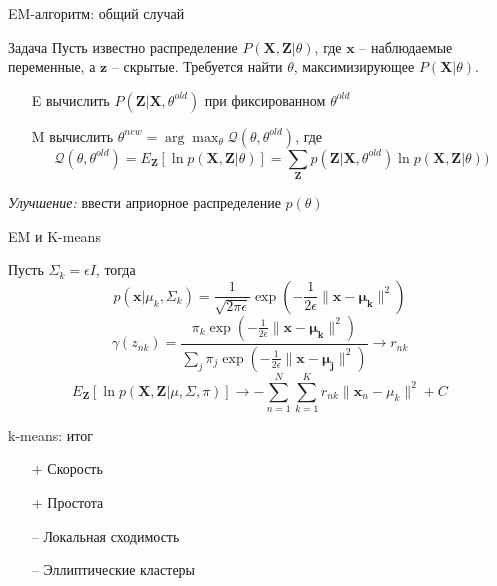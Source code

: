 \documentclass[10pt,a4paper]{beamer}
\begin{document}
\begin{frame}{EM-алгоритм: общий случай}

\begin{block}{Задача}
Пусть известно распределение $P(\mathbf{X}, \mathbf{Z} | \theta)$, где $\mathbf{x}$ -- наблюдаемые переменные, а $\mathbf{z}$ -- скрытые. Требуется найти $\theta$,  максимизирующее $P(\mathbf{X} | \theta)$.
\end{block}

\vspace{1em}
\begin{itemize}
\item[E] вычислить $P(\mathbf{Z} | \mathbf{X}, \theta^{old})$ при фиксированном $\theta^{old}$
\item[M] вычислить $\theta^{new} = \arg \max_{\theta} \mathcal{Q} (\theta, \theta^{old})$, где
\[
\mathcal{Q} (\theta, \theta^{old}) = E_\mathbf{Z}[\ln p(\mathbf{X}, \mathbf{Z} | \theta)] = \sum_{\mathbf{Z}} p(\mathbf{Z} | \mathbf{X}, \theta^{old}) \ln p(\mathbf{X}, \mathbf{Z} | \theta))
\]
\end{itemize}
{\it Улучшение:} ввести априорное распределение $p(\theta)$

\end{frame}


\begin{frame}{EM и K-means}

Пусть $\Sigma_k = \epsilon I$, тогда
\[
p(\mathbf{x} | \mu_k, \Sigma_k) = \frac{1}{\sqrt{2\pi\epsilon}}\exp(-\frac{1}{2\epsilon}\|\mathbf{x}-\mathbf{\mu_k}\|^2)
\]
\[
\gamma(z_{nk}) = \frac{\pi_k \exp(-\frac{1}{2\epsilon}\|\mathbf{x}-\mathbf{\mu_k}\|^2)}{\sum_j \pi_j \exp(-\frac{1}{2\epsilon}\|\mathbf{x}-\mathbf{\mu_j}\|^2)} \rightarrow r_{nk}
\]
\[
E_\mathbf{Z}[\ln p(\mathbf{X}, \mathbf{Z} | \mu, \Sigma, \pi)] \rightarrow -\sum_{n=1}^N \sum_{k=1}^K r_{nk} \| \mathbf{x}_n - \mu_k \|^2 + C
\]

\end{frame}


\begin{frame}{k-means: итог}

\begin{itemize}
\item[+] Скорость
\item[+] Простота
\item[--] Локальная сходимость
\item[--] Эллиптические кластеры
\end{itemize}

\end{frame}
\end{document}
